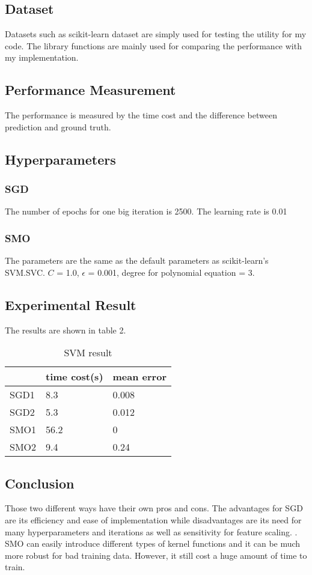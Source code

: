 \documentclass[9pt,shortpaper,twoside,web]{ieeecolor}
\begin{document}
\subsection{Dataset}
Datasets such as scikit-learn dataset are simply used for testing the utility for my code. The library functions are mainly used for comparing the performance with my implementation.
\subsection{Performance Measurement}
The performance is measured by the time cost and the difference between prediction and ground truth.
\subsection{Hyperparameters}
\subsubsection{SGD}The number of epochs for one big iteration is 2500. The learning rate is 0.01
\subsubsection{SMO}The parameters are the same as the default parameters as scikit-learn's SVM.SVC. $C$ = 1.0, $\epsilon$ = 0.001, degree for polynomial equation = 3.
\subsection{Experimental Result}
The results are shown in table 2.
\begin{table}
\centering
\caption{SVM result}
\begin{tabular}{|l|l|l|} 
\hline
     & time cost(s) & mean error  \\ 
\hline
SGD1 & 8.3          & 0.008       \\ 
\hline
SGD2 & 5.3          & 0.012       \\ 
\hline
SMO1 & 56.2         & 0           \\ 
\hline
SMO2 & 9.4          & 0.24        \\
\hline
\end{tabular}
\end{table}


\subsection{Conclusion}
Those two different ways have their own pros and cons. The advantages for SGD are its efficiency and ease of implementation while disadvantages are its need for many hyperparameters and iterations as well as sensitivity for feature scaling. \cite{scikit-learn}. SMO can easily introduce different types of kernel functions and it can be much more robust for bad training data. However, it still cost a huge amount of time to train.




\end{document}
